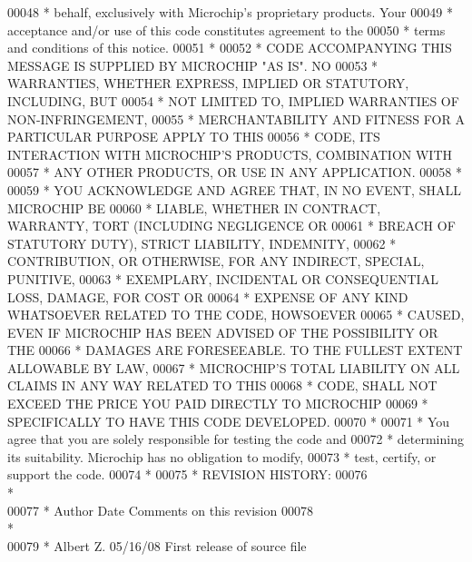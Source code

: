 \begin{DoxyCode}
00048 \textcolor{comment}{* behalf, exclusively with Microchip's proprietary products.  Your }
00049 \textcolor{comment}{* acceptance and/or use of this code constitutes agreement to the }
00050 \textcolor{comment}{* terms and conditions of this notice.}
00051 \textcolor{comment}{*}
00052 \textcolor{comment}{* CODE ACCOMPANYING THIS MESSAGE IS SUPPLIED BY MICROCHIP "AS IS". NO }
00053 \textcolor{comment}{* WARRANTIES, WHETHER EXPRESS, IMPLIED OR STATUTORY, INCLUDING, BUT }
00054 \textcolor{comment}{* NOT LIMITED TO, IMPLIED WARRANTIES OF NON-INFRINGEMENT, }
00055 \textcolor{comment}{* MERCHANTABILITY AND FITNESS FOR A PARTICULAR PURPOSE APPLY TO THIS }
00056 \textcolor{comment}{* CODE, ITS INTERACTION WITH MICROCHIP'S PRODUCTS, COMBINATION WITH }
00057 \textcolor{comment}{* ANY OTHER PRODUCTS, OR USE IN ANY APPLICATION. }
00058 \textcolor{comment}{*}
00059 \textcolor{comment}{* YOU ACKNOWLEDGE AND AGREE THAT, IN NO EVENT, SHALL MICROCHIP BE }
00060 \textcolor{comment}{* LIABLE, WHETHER IN CONTRACT, WARRANTY, TORT (INCLUDING NEGLIGENCE OR}
00061 \textcolor{comment}{* BREACH OF STATUTORY DUTY), STRICT LIABILITY, INDEMNITY, }
00062 \textcolor{comment}{* CONTRIBUTION, OR OTHERWISE, FOR ANY INDIRECT, SPECIAL, PUNITIVE, }
00063 \textcolor{comment}{* EXEMPLARY, INCIDENTAL OR CONSEQUENTIAL LOSS, DAMAGE, FOR COST OR }
00064 \textcolor{comment}{* EXPENSE OF ANY KIND WHATSOEVER RELATED TO THE CODE, HOWSOEVER }
00065 \textcolor{comment}{* CAUSED, EVEN IF MICROCHIP HAS BEEN ADVISED OF THE POSSIBILITY OR THE}
00066 \textcolor{comment}{* DAMAGES ARE FORESEEABLE.  TO THE FULLEST EXTENT ALLOWABLE BY LAW, }
00067 \textcolor{comment}{* MICROCHIP'S TOTAL LIABILITY ON ALL CLAIMS IN ANY WAY RELATED TO THIS}
00068 \textcolor{comment}{* CODE, SHALL NOT EXCEED THE PRICE YOU PAID DIRECTLY TO MICROCHIP }
00069 \textcolor{comment}{* SPECIFICALLY TO HAVE THIS CODE DEVELOPED.}
00070 \textcolor{comment}{*}
00071 \textcolor{comment}{* You agree that you are solely responsible for testing the code and }
00072 \textcolor{comment}{* determining its suitability.  Microchip has no obligation to modify,}
00073 \textcolor{comment}{* test, certify, or support the code.}
00074 \textcolor{comment}{*}
00075 \textcolor{comment}{* REVISION HISTORY:}
00076 \textcolor{comment}{*~~~~~~~~~~~~~~~~~~~~~~~~~~~~~~~~~~~~~~~~~~~~~~~~~~~~~~~~~~~~~~~~~~~~~}
00077 \textcolor{comment}{* Author        Date        Comments on this revision}
00078 \textcolor{comment}{*~~~~~~~~~~~~~~~~~~~~~~~~~~~~~~~~~~~~~~~~~~~~~~~~~~~~~~~~~~~~~~~~~~~~~}
00079 \textcolor{comment}{* Albert Z.     05/16/08    First release of source file}

\end{DoxyCode}
